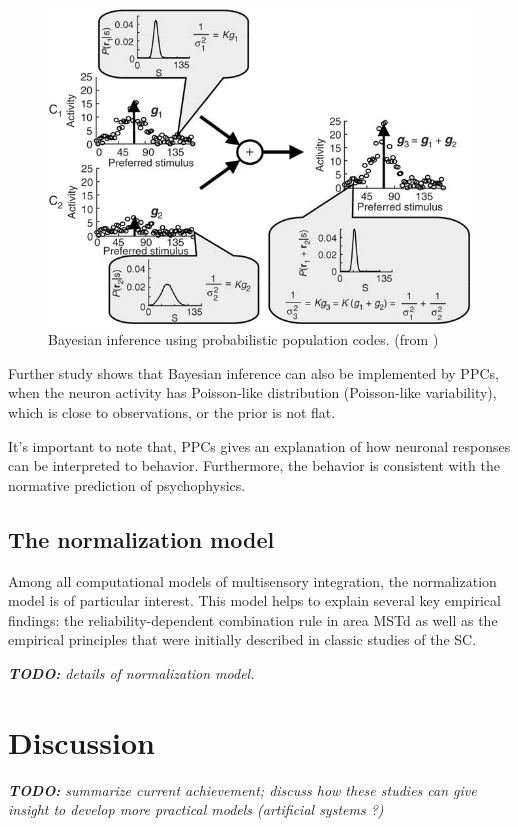 \documentclass{article}[11pt]
\newcommand{\TODO}[1]{\emph{\small{{\bf TODO: } #1}}}
\begin{document}
\begin{figure}[tpbh]
  \centering
  \includegraphics[width=\textwidth]{infer}
  \caption{Bayesian inference using probabilistic population codes. (from \cite{ma_bayesian_2006})}
  \label{fig:infer}
\end{figure}

Further study shows that Bayesian inference can also be implemented by PPCs, when the neuron activity has Poisson-like distribution (Poisson-like variability), which is close to observations, or the prior is not flat.

It's important to note that, PPCs gives an explanation of how neuronal responses can be interpreted to behavior. Furthermore, the behavior is consistent with the normative prediction of psychophysics.

\subsection{The normalization model}
Among all computational models of multisensory integration, the normalization model \cite{ohshiro_normalization_2011} is of particular interest. This model helps to explain several key empirical findings: the reliability-dependent combination rule in area MSTd as well as
the empirical principles that were initially described in classic studies of the SC.

\TODO{details of normalization model.}

\section{Discussion}
\TODO{summarize current achievement; discuss how these studies can give insight to develop more practical models (artificial systems ?)}



\end{document}
